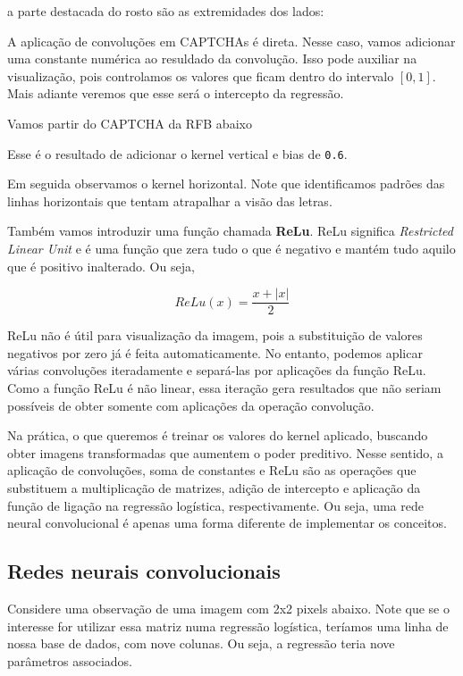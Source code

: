 \documentclass[12pt,]{report}
\begin{document}
a parte destacada do rosto são as extremidades dos lados:

A aplicação de convoluções em CAPTCHAs é direta. Nesse caso, vamos adicionar uma constante numérica ao resuldado da convolução. Isso pode auxiliar na visualização, pois controlamos os valores que ficam dentro do intervalo \([0,1]\). Mais adiante veremos que esse será o intercepto da regressão.

Vamos partir do CAPTCHA da RFB abaixo

Esse é o resultado de adicionar o kernel vertical e bias de \texttt{0.6}.

Em seguida observamos o kernel horizontal. Note que identificamos padrões das linhas horizontais que tentam atrapalhar a visão das letras.

Também vamos introduzir uma função chamada \textbf{ReLu}. ReLu significa \emph{Restricted Linear Unit} e é uma função que zera tudo o que é negativo e mantém tudo aquilo que é positivo inalterado. Ou seja,

\[
ReLu(x) = \frac{x + |x|}{2}
\]

ReLu não é útil para visualização da imagem, pois a substituição de valores negativos por zero já é feita automaticamente. No entanto, podemos aplicar várias convoluções iteradamente e separá-las por aplicações da função ReLu. Como a função ReLu é não linear, essa iteração gera resultados que não seriam possíveis de obter somente com aplicações da operação convolução.

Na prática, o que queremos é treinar os valores do kernel aplicado, buscando obter imagens transformadas que aumentem o poder preditivo. Nesse sentido, a aplicação de convoluções, soma de constantes e ReLu são as operações que substituem a multiplicação de matrizes, adição de intercepto e aplicação da função de ligação na regressão logística, respectivamente. Ou seja, uma rede neural convolucional é apenas uma forma diferente de implementar os conceitos.

\hypertarget{redes-neurais-convolucionais}{%
\subsection{Redes neurais convolucionais}\label{redes-neurais-convolucionais}}

Considere uma observação de uma imagem com 2x2 pixels abaixo. Note que se o interesse for utilizar essa matriz numa regressão logística, teríamos uma linha de nossa base de dados, com nove colunas. Ou seja, a regressão teria nove parâmetros associados.
\end{document}

